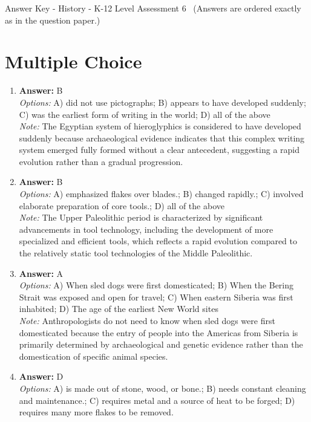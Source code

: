 \documentclass[12pt]{article}
\begin{document}
\begin{center}
Answer Key - History - K-12 Level Assessment 6 \
\small (Answers are ordered exactly as in the question paper.)
\end{center}

\section*{Multiple Choice}
\begin{enumerate}[label=\arabic*.]
\item \textbf{Answer:} B
\\ \textit{Options:} A) did not use pictographs; B) appears to have developed suddenly; C) was the earliest form of writing in the world; D) all of the above
\\ \textit{Note:} The Egyptian system of hieroglyphics is considered to have developed suddenly because archaeological evidence indicates that this complex writing system emerged fully formed without a clear antecedent, suggesting a rapid evolution rather than a gradual progression.
\item \textbf{Answer:} B
\\ \textit{Options:} A) emphasized flakes over blades.; B) changed rapidly.; C) involved elaborate preparation of core tools.; D) all of the above
\\ \textit{Note:} The Upper Paleolithic period is characterized by significant advancements in tool technology, including the development of more specialized and efficient tools, which reflects a rapid evolution compared to the relatively static tool technologies of the Middle Paleolithic.
\item \textbf{Answer:} A
\\ \textit{Options:} A) When sled dogs were first domesticated; B) When the Bering Strait was exposed and open for travel; C) When eastern Siberia was first inhabited; D) The age of the earliest New World sites
\\ \textit{Note:} Anthropologists do not need to know when sled dogs were first domesticated because the entry of people into the Americas from Siberia is primarily determined by archaeological and genetic evidence rather than the domestication of specific animal species.
\item \textbf{Answer:} D
\\ \textit{Options:} A) is made out of stone, wood, or bone.; B) needs constant cleaning and maintenance.; C) requires metal and a source of heat to be forged; D) requires many more flakes to be removed.

\end{enumerate}
\end{document}
